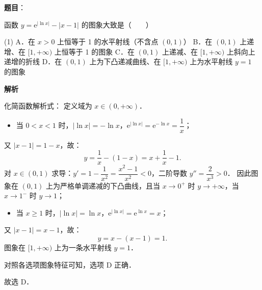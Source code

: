 \begin{answer}

\textbf{题目}：

函数 $y = \mathrm{e}^{|\ln x|} - |x - 1|$ 的图象大致是\mbox{（　　）}
\nopagebreak[4]
\begin{center}\end{center}
\nopagebreak[4]
\begin{gkopts}(1)
\task A．在 $x > 0$ 上恒等于 1 的水平射线（不含点 $(0, 1)$）
\task B．在 $(0, 1)$ 上递增、在 $[1, +\infty)$ 上恒等于 1 的图象
\task C．在 $(0, 1)$ 上递减、在 $[1, +\infty)$ 上斜向上递增的折线
\task D．在 $(0, 1)$ 上为下凸递减曲线、在 $[1, +\infty)$ 上为水平射线 $y = 1$ 的图象
\end{gkopts}

\textbf{解析}

化简函数解析式：
定义域为 $x \in (0, +\infty)$．
\begin{itemize}
\item 当 $0 < x < 1$ 时，$|\ln x| = -\ln x$，$\mathrm{e}^{|\ln x|} = \mathrm{e}^{-\ln x} = \dfrac{1}{x}$；
\end{itemize}
  又 $|x - 1| = 1 - x$，故：
\nopagebreak[4]
\[
y = \frac{1}{x} - (1 - x) = x + \frac{1}{x} - 1.
\]
  对 $x \in (0, 1)$ 求导：$y' = 1 - \dfrac{1}{x^2} = \dfrac{x^2 - 1}{x^2} < 0$，二阶导数 $y'' = \dfrac{2}{x^3} > 0$．
  因此图象在 $(0, 1)$ 上为严格单调递减的下凸曲线，且当 $x \to 0^+$ 时 $y \to +\infty$，当 $x \to 1^-$ 时 $y \to 1$；
\begin{itemize}
\item 当 $x \geqslant 1$ 时，$|\ln x| = \ln x$，$\mathrm{e}^{|\ln x|} = \mathrm{e}^{\ln x} = x$；
\end{itemize}
  又 $|x - 1| = x - 1$，故：
\nopagebreak[4]
\[
y = x - (x - 1) = 1.
\]
  图象在 $[1, +\infty)$ 上为一条水平射线 $y = 1$．

对照各选项图象特征可知，选项 D 正确．

故选 D．


\end{answer}
